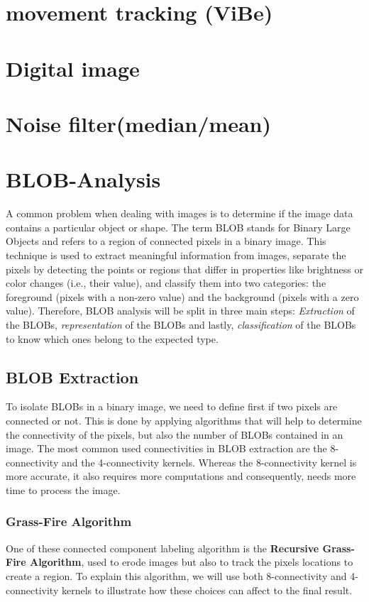 \section{movement tracking (ViBe)}
\section{Digital image}
\section{Noise filter(median/mean)}
\section{BLOB-Analysis}
A common problem when dealing with images is to determine if the image data contains a particular object or shape. The term BLOB stands for Binary Large Objects and refers to a region of connected pixels in a binary image. This technique is used to extract meaningful information from images, separate the pixels by detecting the points or regions that differ in properties like brightness or color changes (i.e., their value), and classify them into two categories: the foreground (pixels with a non-zero value) and the background (pixels with a zero value).
Therefore, BLOB analysis will be split in three main steps: \textit{Extraction} of the BLOBs, \textit{representation} of the BLOBs and lastly, \textit{classification} of the BLOBs to know which ones belong to the expected type.
\subsection{BLOB Extraction}
To isolate BLOBs in a binary image, we need to define first if two pixels are connected or not. This is done by applying algorithms that will help to determine the connectivity of the pixels, but also the number of BLOBs contained in an image. The most common used connectivities in BLOB extraction are the 8-connectivity and the 4-connectivity kernels. Whereas the 8-connectivity kernel is more accurate, it also requires more computations and consequently, needs more time to process the image.


\subsubsection{Grass-Fire Algorithm}
One of these connected component labeling algorithm is the \textbf{Recursive Grass-Fire Algorithm}, used to erode images but also to track the pixels locations to create a region.
To explain this algorithm, we will use both 8-connectivity and 4-connectivity kernels to illustrate how these choices can affect to the final result.

